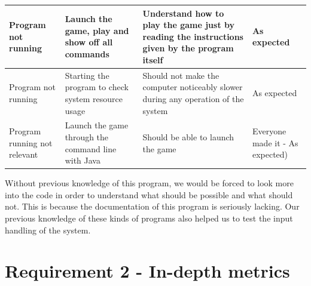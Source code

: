 \documentclass[UKenglish]{article}  %
\begin{document}
\begin{table}[H]
\begin{tabular}{| m{1.5in} |  m{1.5in}  | m{1.5in} | m{0.75in} |}
        Program not running & Launch the game, play and show off all commands &
        Understand how to play the game just by reading the instructions given
        by the program itself & As expected \\ \hline

        Program not running & Starting the program to check system resource
        usage & Should not make the computer noticeably slower during any
        operation of the system & As expected \\ \hline

        Program running not relevant & Launch the game through the command line
        with Java & Should be able to launch the game & Everyone made it - As
        expected) \\ \hline
    \end{tabular}
\end{table}

Without previous knowledge of this program, we would be forced to look more into
the code in order to understand what should be possible and what should not.
This is because the documentation of this program is seriously lacking. Our
previous knowledge of these kinds of programs also helped us to test the input
handling of the system.

\section{Requirement 2 - In-depth metrics}
\end{document}
